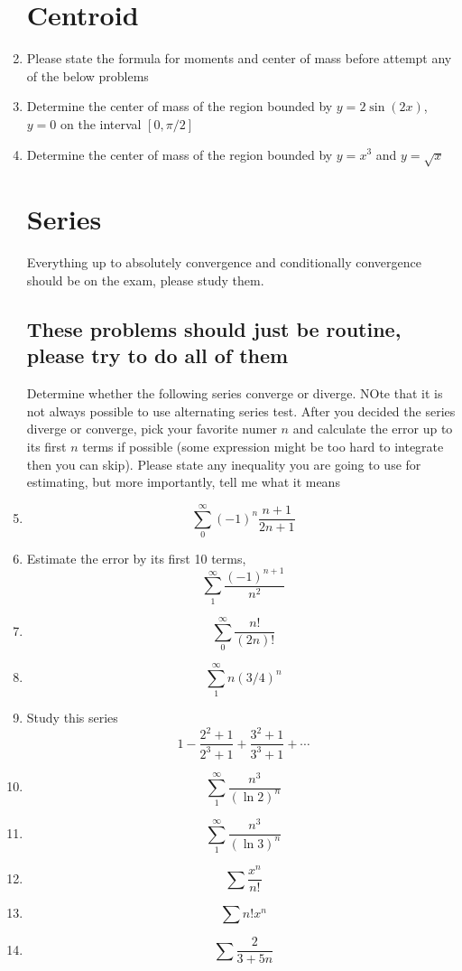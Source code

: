 \begin{enumerate}
\section{Centroid}
\item Please state the formula for moments and center of mass before attempt any of the below problems
\vfill 
\item Determine the center of mass of the region bounded by $y=2\sin(2x)$, $y=0$ on the interval $[0, \pi/2]$
\vfill 
\item Determine the center of mass of the region bounded by $y=x^3$ and $y=\sqrt x$	
\vfill
\newpage
\section{Series}
Everything up to absolutely convergence and conditionally convergence should be on the exam, please study them. 
\subsection{These problems should just be routine, please try to do all of them}
Determine whether the following series converge or diverge. NOte that it is not always possible to use alternating series test. After you decided the series diverge or converge, pick your favorite numer $n$ and calculate the error up to its first $n$ terms if possible (some expression might be too hard to integrate then you can skip). Please state any inequality you are going to use for estimating, but more importantly, tell me what it means

 	\item $$\sum_0^\infty (-1)^n\frac{n+1}{2n+1}$$
 	\vfill
 	\item Estimate the error by its first 10 terms, 
 	$$\sum_1^\infty\frac{(-1)^{n+1}}{n^2}$$
 \vfill
 \item $$\sum_0^\infty\frac{n!}{(2n)!}$$

 \vfill
 \item $$\sum_1^\infty n(3/4)^n$$
 \vfill
 \newpage
 \item Study this series 
 $$1-\frac{2^2+1}{2^3+1}+\frac{3^2+1}{3^3+1}+\cdots$$
 \vfill
 \item $$\sum_1^\infty\frac{n^3}{(\ln2)^n}$$
 \vfill
 \item  $$\sum_1^\infty\frac{n^3}{(\ln3)^n}$$
 \vfill
\newpage
\item
 $$\sum \frac{x^n}{n!}$$
    \vfill
    \item
    $$\sum n!x^n$$
    \vfill 
    \item 
    $$\sum \frac{2}{3+5n}$$
    \vfill


\end{enumerate}
